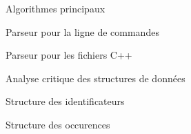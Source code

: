 \documentclass{article}
\begin{document}
\begin{section}{Algorithmes principaux}

  \begin{subsection}{Parseur pour la ligne de commandes}
  \end{subsection}

  \begin{subsection}{Parseur pour les fichiers C++}
  \end{subsection}

\end{section}



\begin{section}{Analyse critique des structures de données}

  \begin{subsection}{Structure des identificateurs}
  \end{subsection}

  \begin{subsection}{Structure des occurences}
  \end{subsection}

\end{section}
\end{document}
